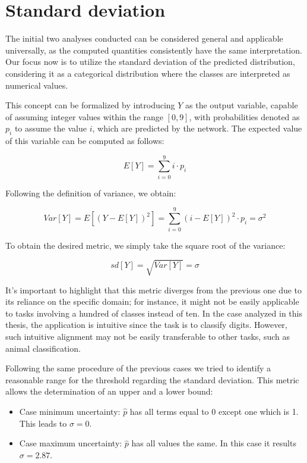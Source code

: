 \section{Standard deviation}

The initial two analyses conducted can be considered general and applicable universally, as the computed quantities consistently have the same interpretation. Our focus now is to utilize the standard deviation of the predicted distribution, considering it as a categorical distribution where the classes are interpreted as numerical values.

This concept can be formalized by introducing $Y$ as the output variable, capable of assuming integer values within the range $[0,9]$, with probabilities denoted as $p_i$ to assume the value $i$, which are predicted by the network. The expected value of this variable can be computed as follows:

\[
	E[Y] = \sum_{i=0}^{9} i \cdot p_i
\]

Following the definition of variance, we obtain:

\[
	Var[Y] = E[(Y - E[Y])^2] = \sum_{i=0}^{9} (i - E[Y])^2 \cdot p_i = \sigma^2
\]

To obtain the desired metric, we simply take the square root of the variance:

\[
	sd[Y] = \sqrt{Var[Y]} = \sigma
\]

It's important to highlight that this metric diverges from the previous one due to its reliance on the specific domain; for instance, it might not be easily applicable to tasks involving a hundred of classes instead of ten.
In the case analyzed in this thesis, the application is intuitive since the task is to classify digits. However, such intuitive alignment may not be easily transferable to other tasks, such as animal classification.

Following the same procedure of the previous cases we tried to identify a reasonable range for the threshold regarding the standard deviation. This metric allows the determination of an upper and a lower bound:

\begin{itemize}
	\item Case minimum uncertainty: $\hat{p}$ has all terms equal to 0 except one which is 1. This leads to $\sigma=0$.
	\item Case maximum uncertainty: $\hat{p}$ has all values the same. In this case it results $\sigma = 2.87$.
\end{itemize}

